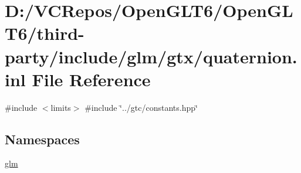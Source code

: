 \hypertarget{gtx_2quaternion_8inl}{}\section{D\+:/\+V\+C\+Repos/\+Open\+G\+L\+T6/\+Open\+G\+L\+T6/third-\/party/include/glm/gtx/quaternion.inl File Reference}
\label{gtx_2quaternion_8inl}
{\ttfamily \#include $<$limits$>$}\newline
{\ttfamily \#include \char`\"{}../gtc/constants.\+hpp\char`\"{}}\newline
\subsection*{Namespaces}
\begin{DoxyCompactItemize}
\item 
 \mbox{\hyperlink{namespaceglm}{glm}}
\end{DoxyCompactItemize}
